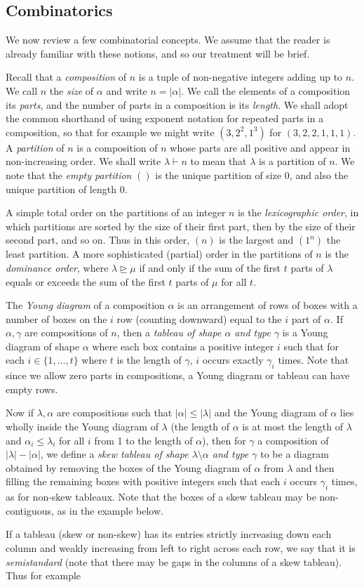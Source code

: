 \subsection{Combinatorics}
We now review a few combinatorial concepts. We assume that the reader is already familiar with these notions, and so our treatment will
be brief.

Recall that a \textit{composition} of $n$ is a tuple of non-negative integers adding up to $n$. We call $n$ the \textit{size} of $\alpha$
and write $n = |\alpha|$. We call the elements of a composition its \textit{parts}, and the number of parts in a composition is its
\textit{length}. We shall adopt the common shorthand of using exponent
notation for repeated parts in a composition, so that for example we might write $(3,2^2,1^3)$ for $(3,2,2,1,1,1)$.
A \textit{partition} of $n$ is a composition of $n$ whose parts are all positive and appear in non-increasing order. We shall write
$\lambda \vdash n$ to mean that $\lambda$ is a partition of $n$. We note that the \textit{empty partition} $()$ is the unique partition
of size 0, and also the unique partition of length 0.

A simple total order on the partitions of an integer $n$ is the \textit{lexicographic order}, in which partitions are sorted by the
size of their first part, then by the size of their second part, and so on. Thus in this order, $(n)$ is the largest and $(1^n)$ the
least partition.
A more sophisticated (partial) order in the partitions of $n$ is the \textit{dominance order}, where $\lambda \trianglerighteq \mu$ if and
only if the sum of the first $t$ parts of $\lambda$ equals or exceeds the sum of the first $t$ parts of $\mu$ for all $t$.

The \textit{Young diagram} of a composition $\alpha$ is an arrangement of rows of boxes with a number of boxes on the $i$ row
(counting downward) equal to the $i$ part of $\alpha$.
If $\alpha,\gamma$ are compositions of $n$, then a \textit{tableau of shape $\alpha$ and type $\gamma$} is a Young diagram of shape
$\alpha$ where each box contains a positive integer $i$ such that for each $i \in \{1,\ldots,t\}$ where $t$ is the length of $\gamma$,
$i$ occurs exactly $\gamma_i$ times.
Note that since we allow zero parts in compositions, a Young diagram or tableau can have empty rows.

Now if $\lambda,\alpha$ are compositions such that $|\alpha|\leq|\lambda|$ and the Young diagram of $\alpha$ lies wholly inside the Young
diagram of $\lambda$ (\ie the length of $\alpha$ is at most the length of $\lambda$ and $\alpha_i \leq \lambda_i$ for all $i$ from 1 to
the length of $\alpha$), then for $\gamma$ a composition of $|\lambda|-|\alpha|$, we define a \textit{skew tableau of shape $\lambda
\setminus \alpha$ and type $\gamma$} to be a diagram obtained by removing the boxes of the Young diagram of $\alpha$ from $\lambda$ and
then filling the remaining boxes with positive integers such that each $i$ occurs $\gamma_i$ times, as for non-skew tableaux. Note that
the boxes of a skew tableau may be non-contiguous, as in the example below.

If a tableau (skew or non-skew) has its entries strictly increasing down each column and weakly increasing from left to right across each
row, we say that it is \textit{semistandard} (note that there may be gaps in the columns of a skew tableau). Thus for example
